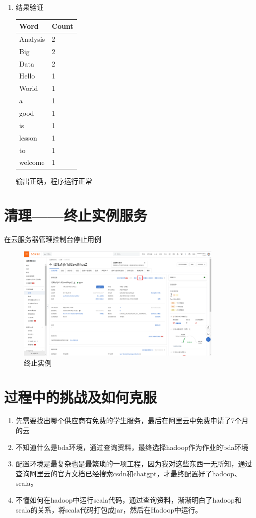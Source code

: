 \documentclass{article}
\begin{document}
\begin{enumerate}
\begin{figure}[htp]
        \label{fig:a}
    \end{figure}
    \item 结果验证
    \par
    \begin{tabular}{|l|l|}
    \hline
    Word & Count \\
    \hline
    Analysis & 2 \\
    Big & 2 \\
    Data & 2 \\
    Hello & 1 \\
    World & 1 \\
    a & 1 \\
    good & 1 \\
    is & 1 \\
    lesson & 1 \\
    to & 1 \\
    welcome & 1 \\
    \hline
    \end{tabular}
    \par
    输出正确，程序运行正常
\end{enumerate}
\section{清理——终止实例服务}
在云服务器管理控制台停止用例
    \begin{figure}[htp]
        \centering
        \includegraphics[width=10cm]{终止实例.png}
        \caption{终止实例}
        \label{fg:a}
    \end{figure}

\section{过程中的挑战及如何克服}
\begin{enumerate}
    \item 先需要找出哪个供应商有免费的学生服务，最后在阿里云中免费申请了7个月的云
    \item 不知道什么是bda环境，通过查询资料，最终选择hadoop作为作业的bda环境
    \item 配置环境是最复杂也是最繁琐的一项工程，因为我对这些东西一无所知，通过查询阿里云的官方文档已经搜索csdn和chatgpt，才最终配置好了hadoop、scala。
    \item 不懂如何在hadoop中运行scala代码，通过查询资料，渐渐明白了hadoop和scala的关系，将scala代码打包成jar，然后在Hadoop中运行。
\end{enumerate}
\end{document}
